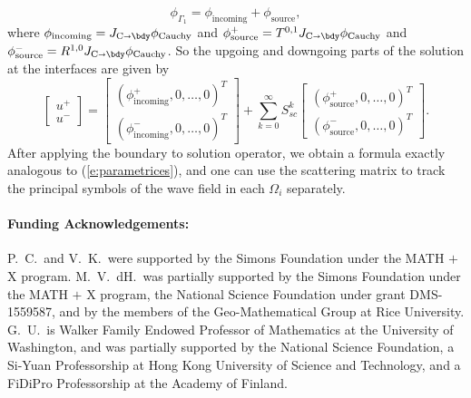 \documentclass[10pt]{article}
\theoremstyle{plain}
\theoremstyle{definition}
\theoremstyle{remark}
\numberwithin{theorem}{section}
\numberwithin{example}{section}
\numberwithin{equation}{section}
\numberwithin{figure}{section}
\newcommand\JCB{J_{\text C\shortrightarrow \bdy}}		%
\newcommand{\col}[1]{\begin{bmatrix}#1\end{bmatrix}}
\def \u{ \mathbf{u}} \def \f{\mathbf{f}}
\begin{document}
$$\phi_{\Gamma_1} = \phi_{\text{incoming}} + \phi_{\text{source}},$$
 where $\phi_{\text{incoming}}=\JCB \phi_{\text{Cauchy}}$ and $\phi_{\text{source}}^+ = T^{0,1}\JCB\phi_{\text{Cauchy}}$ and
$\phi_{\text{source}}^- = R^{1,0}\JCB\phi_{\text{Cauchy}}$. So the upgoing and downgoing parts of the solution at the interfaces are given by
\[
\col{u^+\\u^-} = \col{(\phi^+_{\text{incoming}},0,\dots,0)^T\\(\phi^-_{\text{incoming}},0,\dots,0)^T} + \sum_{k=0}^{\infty} S^k_{sc} \col{(\phi^+_{\text{source}},0,\dots,0)^T\\(\phi^-_{\text{source}},0,\dots,0)^T}.
\]
After applying the boundary to solution operator, we obtain a formula exactly analogous to (\ref{e:parametrices}),
and one can use the scattering matrix to track the principal symbols of the wave field in each $\Omega_i$ separately.




\paragraph{Funding Acknowledgements:} P.~C.~and V.~K.~were supported by the Simons Foundation                 
under the MATH $+$ X program. M.~V.~dH.~was partially supported by the Simons Foundation                 
under the MATH $+$ X program, the National Science Foundation under                 
grant DMS-1559587, and by the members of the Geo-Mathematical Group at              
Rice University. G.~U.~is Walker Family Endowed Professor of Mathematics at the University of Washington, and was partially supported by the National Science Foundation, a Si-Yuan Professorship at Hong Kong University of Science and Technology, and a FiDiPro Professorship at the Academy of Finland.



\end{document}
